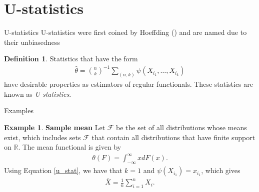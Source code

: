 \documentclass{beamer}
\newcommand{\R}{{\mathbb{R}}}
\theoremstyle{definition}
\newtheorem{Def}{Definition}
\numberwithin{Def}{section}
\newtheorem{ex}{Example}
\begin{document}
\section{U-statistics}
\begin{frame}{U-statistics}
U-statistics were first coined by Hoeffding (\cite{hoeffding1948}) and are named due to their unbiasedness
\begin{Def}
Statistics that have the form
        \begin{align}\label{u_stat}
        \hat{\theta} = {n \choose k}^{-1} \sum_{(n,k)} \psi(X_{i_1}, \dotsc, X_{i_k})
    \end{align} 
have desirable properties as estimators of regular functionals. These statistics are known as \textit{U-statistics}. 
\end{Def}
\end{frame}
\begin{frame}{Examples}
\begin{ex}\textbf{Sample mean}
Let $\mathcal{F}$ be the set of all distributions whose means exist, which includes sets $\mathcal{F}$ that contain all distributions that have finite support on $\R$. The mean functional is given by \begin{align*}\theta(F) = \int_{-\infty}^{\infty} x dF(x).\end{align*} Using Equation \ref{u_stat}, we have that $k=1$ and $\psi(X_{i_1}) = x_{i_1}$, which gives \begin{align*}\bar{X} = \frac{1}{n}\sum_{i=1}^n X_i.\end{align*}
\end{ex}
\end{frame}
\end{document}
